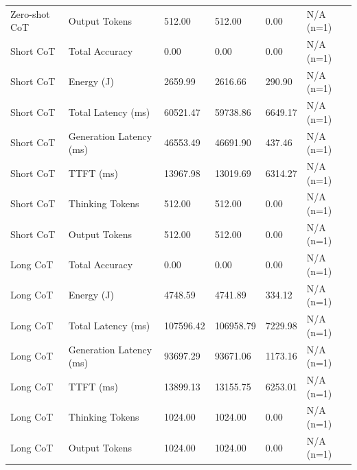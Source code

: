 \begin{table}
\begin{tabular}{llllll}
Zero-shot CoT & Output Tokens & 512.00 & 512.00 & 0.00 & N/A (n=1) \\
Short CoT & Total Accuracy & 0.00 & 0.00 & 0.00 & N/A (n=1) \\
Short CoT & Energy (J) & 2659.99 & 2616.66 & 290.90 & N/A (n=1) \\
Short CoT & Total Latency (ms) & 60521.47 & 59738.86 & 6649.17 & N/A (n=1) \\
Short CoT & Generation Latency (ms) & 46553.49 & 46691.90 & 437.46 & N/A (n=1) \\
Short CoT & TTFT (ms) & 13967.98 & 13019.69 & 6314.27 & N/A (n=1) \\
Short CoT & Thinking Tokens & 512.00 & 512.00 & 0.00 & N/A (n=1) \\
Short CoT & Output Tokens & 512.00 & 512.00 & 0.00 & N/A (n=1) \\
Long CoT & Total Accuracy & 0.00 & 0.00 & 0.00 & N/A (n=1) \\
Long CoT & Energy (J) & 4748.59 & 4741.89 & 334.12 & N/A (n=1) \\
Long CoT & Total Latency (ms) & 107596.42 & 106958.79 & 7229.98 & N/A (n=1) \\
Long CoT & Generation Latency (ms) & 93697.29 & 93671.06 & 1173.16 & N/A (n=1) \\
Long CoT & TTFT (ms) & 13899.13 & 13155.75 & 6253.01 & N/A (n=1) \\
Long CoT & Thinking Tokens & 1024.00 & 1024.00 & 0.00 & N/A (n=1) \\
Long CoT & Output Tokens & 1024.00 & 1024.00 & 0.00 & N/A (n=1) \\
\bottomrule
\end{tabular}
\end{table}
